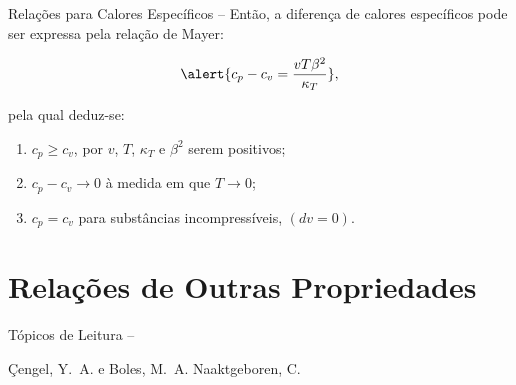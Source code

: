 \begin{frame}[allowframebreaks]{Relações para Calores Específicos --}
        \pagebreak
        Então, a diferença de calores específicos pode ser expressa pela \alert{relação de
        Mayer}:

        \begin{equation*}
            \alert{
                c_p - c_v =
                    \frac{vT\beta^2}{\kappa_T}
            },
        \end{equation*}

        \noindent pela qual deduz-se:\vspace*\medskipamount

        \begin{enumerate}
            \item \alert{$c_p \geqslant c_v$}, por $v$, $T$, $\kappa_T$ e $\beta^2$ serem
                positivos;
            \item \alert{$c_p - c_v \to 0$ à medida em que $T \to 0$};
            \item \alert{$c_p = c_v$ para substâncias incompressíveis}, $(dv = 0)$.
        \end{enumerate}

    \end{frame}

\section{Relações de Outras Propriedades}

    \begin{frame}[allowframebreaks]{Tópicos de Leitura --}
        \begin{thebibliography}{Çengel, Y.~A., 2013}
                Çengel, Y.~A. e Boles, M.~A.
                Naaktgeboren, C.
        \end{thebibliography}
    \end{frame}




